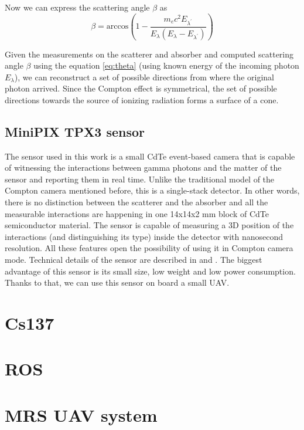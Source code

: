 {  Now we can express the scattering angle $\beta$ as
  \begin{equation}
      \beta = \mathrm{arccos} \left (  1-\frac{m_{e}c^{2}E_{\lambda^{\prime}}}{E_{\lambda} (E_{\lambda} - E_{\lambda^{\prime}})} \right )
  \end{equation}

  Given the measurements on the scatterer and absorber and computed scattering angle $\beta$ using the equation \ref{eq:theta} (using known energy of the incoming photon $E_{\lambda}$), we can reconstruct a set of possible directions from where the original photon arrived. Since the Compton effect is symmetrical, the set of possible directions towards the source of ionizing radiation forms a surface of a cone.



  \subsection{MiniPIX TPX3 sensor}
  The sensor used in this work is a small CdTe event-based camera that is capable of witnessing the interactions between gamma photons and the matter of the sensor and reporting them in real time.
  Unlike the traditional model of the Compton camera mentioned before, this is a single-stack detector.
  In other words, there is no distinction between the scatterer and the absorber and all the measurable interactions are happening in one 14x14x2 mm block of CdTe semiconductor material.
  The sensor is capable of measuring a 3D position of the interactions (and distinguishing its type) inside the detector with nanosecond resolution. 
  All these features open the possibility of using it in Compton camera mode.
  Technical details of the sensor are described in \cite{baca2021gamma} and \cite{baca2019timepix}.
  The biggest advantage of this sensor is its small size, low weight and low power consumption.
  Thanks to that, we can use this sensor on board a small UAV. 


  \section{Cs137}

  \section{ROS}

  \section{MRS UAV system}
}
